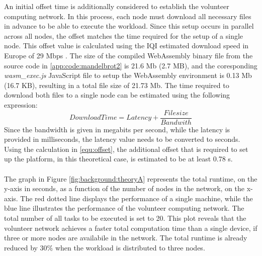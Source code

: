 An initial offset time is additionally considered to establish the volunteer computing network. In this process, each node must download all necessary files in advance to be able to execute the workload. Since this setup occurs in parallel across all nodes, the offset matches the time required for the setup of a single node. This offset value is calculated using the \ac{IQI} estimated download speed in Europe of 29 Mbps \cite{backend:latency}. The size of the compiled WebAssembly binary file from the source code in \ref{app:code:mandelbrot2} is 21.6 Mb (2.7 MB), and the coresponding \emph{wasm\_exec.js} JavaScript file to setup the WebAssembly environment is 0.13 Mb (16.7 KB), resulting in a total file size of 21.73 Mb. The time required to download both files to a single node can be estimated using the following expression:
\begin{equation}
 DownloadTime = Latency + \frac{Filesize}{Bandwith} 
 \label{equ:offset}
\end{equation}
Since the bandwidth is given in megabits per second, while the latency is provided in milliseconds, the latency value needs to be converted to seconds. Using the calculation in \ref{equ:offset}, the additional offset that is required to set up the platform, in this theoretical case, is estimated to be at least 0.78 s.
\\~\\
The graph in Figure \ref{fig:background:theoryA} represents the total runtime, on the y-axis in seconds, as a function of the number of nodes in the network, on the x-axis. The red dotted line displays the performance of a single machine, while the blue line illustrates the performance of the volunteer computing network. The total number of all tasks to be executed is set to 20. This plot reveals that the volunteer network achieves a faster total computation time than a single device, if three or more nodes are availabile in the network. The total runtime is already reduced by 30\% when the workload is distributed to three nodes.
\clearpage
